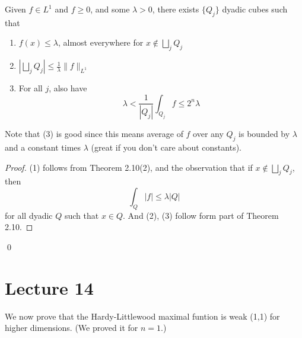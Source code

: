 \begin{theorem}
    Given $f\in L^1$ and $f\geq 0$, and some $\lambda>0$, there exists $\{Q_j\}$ dyadic cubes such that
    \begin{enumerate}
        \item $f(x)\leq\lambda$, almost everywhere for $x\not\in\bigsqcup_jQ_j$
        \item $\left|\bigsqcup_jQ_j \right|\leq\frac{1}{\lambda}\|f\|_{L^1}$
        \item For all $j$, also have
            \begin{equation*}
                \lambda<\frac{1}{|Q_j|}\int_{Q_j}f\leq 2^n\lambda
            \end{equation*}
    \end{enumerate}
\end{theorem}
\begin{remark}
    Note that (3) is good since this means average of $f$ over any $Q_j$ is bounded by $\lambda$ and a constant times $\lambda$ (great if you don't care about constants).
\end{remark}
\begin{proof}
    (1) follows from Theorem 2.10(2), and the observation that if $x\not\in\bigsqcup_jQ_j$, then 
    \begin{equation*}
        \int_{Q}|f|\leq\lambda|Q|
    \end{equation*}
    for all dyadic $Q$ such that $x\in Q$. And (2), (3) follow form part of Theorem 2.10.
\end{proof}
\qed


\section{Lecture 14}
We now prove that the Hardy-Littlewood maximal funtion is weak (1,1) for higher dimensions. (We proved it for $n=1$.)

